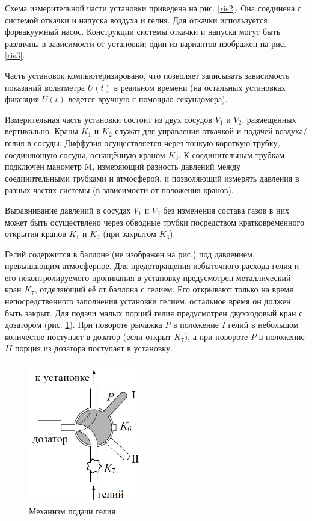 \documentclass[a4paper, 12pt]{article}
\begin{document}
Схема измерительной части установки приведена на рис. \ref{ris2}. Она соединена с системой откачки и напуска воздуха и гелия. Для откачки используется форвакуумный насос. Конструкции системы откачки и напуска могут быть различны в зависимости от установки; один из вариантов изображен на рис. \ref{ris3}.

Часть установок компьютеризировано, что позволяет записывать зависимость показаний вольтметра $ U(t) $ в реальном времени (на остальных установках фиксация $ U(t) $ ведется вручную с помощью секундомера).

Измерительная часть установки состоит из двух сосудов $ V_1 $ и $ V_2 $, размещённых вертикально. Краны $ K_1 $ и $ K_2 $ служат для управления откачкой и подачей воздуха/гелия в сосуды. Диффузия осуществляется через тонкую короткую трубку, соединяющую сосуды, оснащённую краном $ K_3 $. К соединительным трубкам подключен манометр M, измеряющий разность давлений между соединительными трубками и атмосферой, и позволяющий измерять давления в разных частях системы (в зависимости от положения кранов).

Выравнивание давлений в сосудах $ V_1 $ и $ V_2 $ без изменения состава газов в них может быть осуществлено через обводные трубки посредством кратковременного открытия кранов $ K_1 $ и $ K_2 $ (при закрытом $ K_3 $).

Гелий содержится в баллоне (не изображен на рис.) под давлением, превышающим атмосферное. Для предотвращения избыточного расхода гелия и его неконтролируемого проникания в установку предусмотрен металлический кран $ K_7 $, отделяющий её от баллона с гелием. Его открывают только на время непосредственного заполнения установки гелием, остальное время он должен быть закрыт. Для подачи малых порций гелия предусмотрен двухходовый кран с дозатором (рис. \ref{ris4}). При повороте рычажка $ P $ в положение $ I $ гелий в небольшом количестве поступает в дозатор (если открыт $ K_7 $), а при повороте $ P $ в положение $ II $ порция из дозатора поступает в установку.

\begin{figure}
	\includegraphics[width=5cm]{ris4.jpg}
	\caption{Механизм подачи гелия}
	\label{ris4}
\end{figure}
\end{document}

